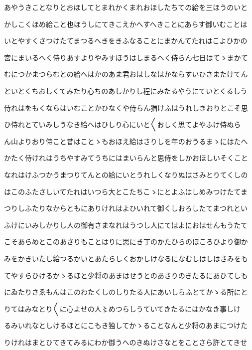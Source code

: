 \documentclass[a4paper,11pt,landscape]{ltjtarticle}
\begin{document}
あやうきことなりとおほしてとまれかくまれおほしたちての給を三ほうのいと
\par\medskip
かしこくほめ給こと也ほうしにてきこえかへすへきことにあらす御いむことは
\par\medskip
いとやすくさつけたてまつるへきをきふなることにまかんてたれはこよひかの
\par\medskip
宮にまいるへく侍りあすよりやみすほうはしまるへく侍らん七日はてゝまかて
\par\medskip
むにつかまつらむとの給へはかのあま君おはしなはかならすいひさまたけてん
\par\medskip
といとくちおしくてみたり心ちのあしかりし程にみたるやうにていとくるしう
\par\medskip
侍れはをもくならはいむことかひなくや侍らん猶けふはうれしきおりとこそ思
\par\medskip
ひ侍れとていみしうなき給へはひしり心にいと〱おしく思てよやふけ侍ぬら
\par\medskip
ん山よりおり侍こと昔はことゝもおほえ給はさりしを年のおうるまゝにはたへ
\par\medskip
かたく侍けれはうちやすみてうちにはまいらんと思侍をしかおほしいそくこと
\par\medskip
なれはけふつかうまつりてんとの給にいとうれしくなりぬはさみとりてくしの
\par\medskip
はこのふたさしいてたれはいつら大とこたちこゝにとよふはしめみつけたてま
\par\medskip
つりしふたりなからともにありけれはよひいれて御くしおろしたてまつれとい
\par\medskip
ふけにいみしかりし人の御有さまなれはうつし人にてはよにおはせんもうたて
\par\medskip
こそあらめとこのあさりもことはりに思にき丁のかたひらのほころひより御か
\par\medskip
みをかきいたし給つるかいとあたらしくおかしけなるになむしはしはさみをも
\par\medskip
てやすらひけるかゝるほと少将のあまはせうとのあさりのきたるにあひてしも
\par\medskip
にゐたりさゑもんはこのわたくしのしりたる人にあいしらふとてかゝる所にと
\par\medskip
りてはみなとり〱に心よせの人〻めつらしうていてきたるにはかなき事しけ
\par\medskip
るみいれなとしけるほとにこもき独してかゝることなんと少将のあまにつけた
\par\medskip
りけれはまとひてきてみるにわか御うへのきぬけさなとをことさら許とてきせ
\par\medskip
\end{document}
